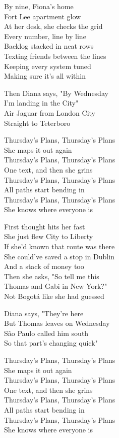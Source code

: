 \begin{lyrics}
By nine, Fiona's home\\
Fort Lee apartment glow\\
At her desk, she checks the grid\\
Every number, line by line\\
Backlog stacked in neat rows\\
Texting friends between the lines\\
Keeping every system tuned\\
Making sure it's all within

Then Diana says, "By Wednesday\\
I'm landing in the City"\\
Air Jaguar from London City\\
Straight to Teterboro

Thursday's Plans, Thursday's Plans\\
She maps it out again\\
Thursday's Plans, Thursday's Plans\\
One text, and then she grins\\
Thursday's Plans, Thursday's Plans\\
All paths start bending in\\
Thursday's Plans, Thursday's Plans\\
She knows where everyone is

First thought hits her fast\\
She just flew City to Liberty\\
If she'd known that route was there\\
She could've saved a stop in Dublin\\
And a stack of money too\\
Then she asks, "So tell me this\\
Thomas and Gabi in New York?"\\
Not Bogotá like she had guessed

Diana says, "They're here\\
But Thomas leaves on Wednesday\\
São Paulo called him south\\
So that part's changing quick"

Thursday's Plans, Thursday's Plans\\
She maps it out again\\
Thursday's Plans, Thursday's Plans\\
One text, and then she grins\\
Thursday's Plans, Thursday's Plans\\
All paths start bending in\\
Thursday's Plans, Thursday's Plans\\
She knows where everyone is


\end{lyrics}

